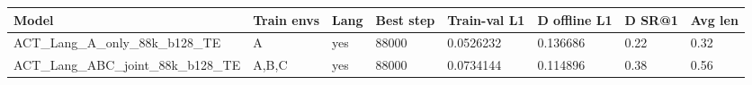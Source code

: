 \begin{tabular}{llllllll}
\toprule
Model & Train envs & Lang & Best step & Train-val L1 & D offline L1 & D SR@1 & Avg len \\
\midrule
ACT\_Lang\_A\_only\_88k\_b128\_TE & A & yes & 88000 & 0.0526232 & 0.136686 & 0.22 & 0.32 \\
ACT\_Lang\_ABC\_joint\_88k\_b128\_TE & A,B,C & yes & 88000 & 0.0734144 & 0.114896 & 0.38 & 0.56 \\
\bottomrule
\end{tabular}
